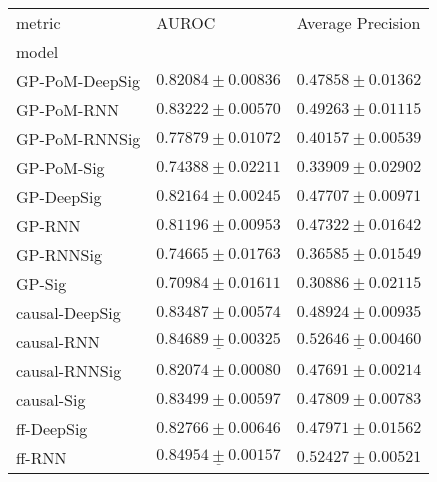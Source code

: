 \begin{tabular}{lll}
\toprule
metric &                                             AUROC &                                 Average Precision \\
model          &                                                   &                                                   \\
\midrule
GP-PoM-DeepSig &                           $ 0.82084 \pm 0.00836 $ &                           $ 0.47858 \pm 0.01362 $ \\
GP-PoM-RNN     &                           $ 0.83222 \pm 0.00570 $ &                           $ 0.49263 \pm 0.01115 $ \\
GP-PoM-RNNSig  &                           $ 0.77879 \pm 0.01072 $ &                           $ 0.40157 \pm 0.00539 $ \\
GP-PoM-Sig     &                           $ 0.74388 \pm 0.02211 $ &                           $ 0.33909 \pm 0.02902 $ \\
GP-DeepSig     &                           $ 0.82164 \pm 0.00245 $ &                           $ 0.47707 \pm 0.00971 $ \\
GP-RNN         &                           $ 0.81196 \pm 0.00953 $ &                           $ 0.47322 \pm 0.01642 $ \\
GP-RNNSig      &                           $ 0.74665 \pm 0.01763 $ &                           $ 0.36585 \pm 0.01549 $ \\
GP-Sig         &                           $ 0.70984 \pm 0.01611 $ &                           $ 0.30886 \pm 0.02115 $ \\
causal-DeepSig &                           $ 0.83487 \pm 0.00574 $ &                           $ 0.48924 \pm 0.00935 $ \\
causal-RNN     &            $  \underline{ 0.84689 \pm 0.00325 } $ &  $  \mathbf{ \underline{ 0.52646 \pm 0.00460 }} $ \\
causal-RNNSig  &                           $ 0.82074 \pm 0.00080 $ &                           $ 0.47691 \pm 0.00214 $ \\
causal-Sig     &                           $ 0.83499 \pm 0.00597 $ &                           $ 0.47809 \pm 0.00783 $ \\
ff-DeepSig     &                           $ 0.82766 \pm 0.00646 $ &                           $ 0.47971 \pm 0.01562 $ \\
ff-RNN         &  $  \mathbf{ \underline{ 0.84954 \pm 0.00157 }} $ &               $  \mathbf{ 0.52427 \pm 0.00521 } $ \\

\end{tabular}

